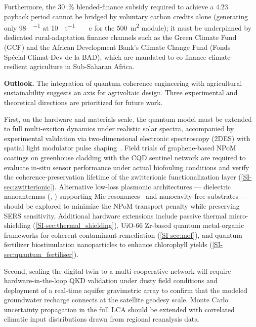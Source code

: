 \documentclass[preprint,12pt]{elsarticle}
\begin{document}
Furthermore, the \qty{30}{\percent} blended-finance subsidy required to achieve a \qty{4.23}{\yr} payback period cannot be bridged by voluntary carbon credits alone (generating only \qty{98}{\USD\per\yr} at \qty{10}{\USD\per\tonne\ e} for the \qty{500}{\m\squared} module); it must be underpinned by dedicated rural-adaptation finance channels such as the Green Climate Fund (GCF) and the African Development Bank's Climate Change Fund (Fonds Sp\'{e}cial Climat-Dev de la BAD), which are mandated to co-finance climate-resilient agriculture in Sub-Saharan Africa.

\textbf{Outlook.} The integration of quantum coherence engineering with agricultural sustainability suggests an axis for agrivoltaic design. Three experimental and theoretical directions are prioritized for future work.

First, on the hardware and materials scale, the quantum model must be extended to full multi-exciton dynamics under realistic solar spectra, accompanied by experimental validation via two-dimensional electronic spectroscopy (2DES) with spatial light modulator pulse shaping~\cite{Gunthardt2023,Sebastian2024}. Field trials of graphene-based NPoM coatings on greenhouse cladding with the CQD sentinel network are required to evaluate in-situ sensor performance under actual biofouling conditions and verify the coherence-preservation lifetime of the zwitterionic functionalization layer (\cref{SI-sec:zwitterionic}). Alternative low-loss plasmonic architectures --- dielectric nanoantennas (, ) supporting Mie resonances~\cite{Caldarola2015} and nanocavity-free substrates --- should be explored to minimize the NPoM transport penalty while preserving SERS sensitivity. Additional hardware extensions include passive thermal micro-shielding (\cref{SI-sec:thermal_shielding}), UiO-66 Zr-based quantum metal-organic frameworks for coherent contaminant remediation (\cref{SI-sec:mof}), and quantum fertilizer biostimulation nanoparticles to enhance chlorophyll yields (\cref{SI-sec:quantum_fertiliser}).

Second, scaling the digital twin to a multi-cooperative network will require hardware-in-the-loop QKD validation under dusty field conditions and deployment of a real-time aquifer gravimetric array to confirm that the modeled groundwater recharge connects at the satellite geodesy scale. Monte Carlo uncertainty propagation in the full LCA should be extended with correlated climatic input distributions drawn from regional reanalysis data.
\end{document}

